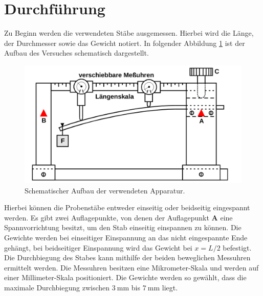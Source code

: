 \section{Durchführung}
\label{sec:Durchführung}
Zu Beginn werden die verwendeten Stäbe ausgemessen. Hierbei wird die Länge, der
Durchmesser sowie das Gewicht notiert.
In folgender Abbildung \ref{fig:aufbau} ist der Aufbau des Versuches schematisch dargestellt.
\begin{figure}[H]
  \centering
  \includegraphics[scale=0.4]{content/versuchsaufbau.png}
  \caption{Schematischer Aufbau der verwendeten Apparatur.}
  \label{fig:aufbau}
\end{figure}
\noindent
Hierbei können die Probenstäbe entweder einseitig oder beidseitig eingespannt
werden. Es gibt zwei Auflagepunkte, von denen der Auflagepunkt \textbf{A} eine
Spannvorrichtung besitzt, um den Stab einseitig einspannen zu können.
Die Gewichte werden bei einseitiger Einspannung an das nicht eingespannte
Ende gehängt, bei beidseitiger Einspannung wird das Gewicht bei $x = L/2$ befestigt.
Die Durchbiegung des Stabes kann mithilfe der beiden beweglichen Messuhren ermittelt werden.
Die Messuhren besitzen eine Mikrometer-Skala und werden auf einer Millimeter-Skala positioniert.
Die Gewichte werden so gewählt, dass die maximale Durchbiegung zwischen $\SI{3}{\milli\meter}$ bis
$\SI{7}{\milli\meter}$ liegt.
